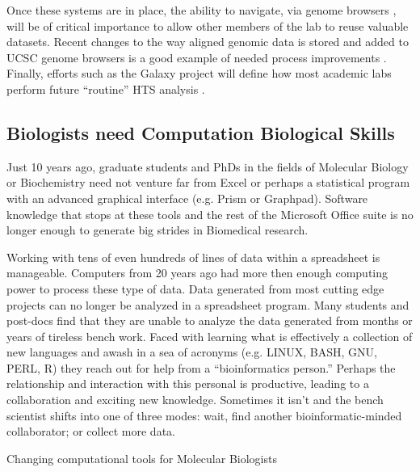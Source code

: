     Once these systems are in place, the ability to navigate, via genome browsers \citep{Zweig2008,Robinson2011}, will be of critical importance to allow other members of the lab to reuse valuable datasets. Recent changes to the way aligned genomic data is stored and added to UCSC genome browsers is a good example of needed process improvements \citep{Raney2013}. Finally, efforts such as the Galaxy project will define how most academic labs perform future ``routine'' HTS analysis \citep{Blankenberg2010}.

  \subsection{Biologists need Computation Biological Skills}
    \label{Disc:subsec:Biologists need Comp Skills}

    Just 10 years ago, graduate students and PhDs in the fields of Molecular Biology or Biochemistry need not venture far from Excel or perhaps a statistical program with an advanced graphical interface (e.g. Prism or Graphpad). Software knowledge that stops at these tools and the rest of the Microsoft Office suite is no longer enough to generate big strides in Biomedical research.

    Working with tens of even hundreds of lines of data within a spreadsheet is manageable. Computers from 20 years ago had more then enough computing power to process these type of data. Data generated from most cutting edge projects can no longer be analyzed in a spreadsheet program. Many students and post-docs find that they are unable to analyze the data generated from months or years of tireless bench work. Faced with learning what is effectively a collection of new languages and awash in a sea of acronyms (e.g. LINUX, BASH, GNU, PERL, R) they reach out for help from a ``bioinformatics person.'' Perhaps the relationship and interaction with this personal is productive, leading to a collaboration and exciting new knowledge. Sometimes it isn't and the bench scientist shifts into one of three modes: wait, find another bioinformatic-minded collaborator; or collect more data.

    \begin{table} %
      \caption[Changing computational tools for Molecular Biologists] 
        {
         Changing computational tools for Molecular Biologists
         }
       \label{Disc:tab:Comp tools for Molecular Biology}
       
       \end{table}

